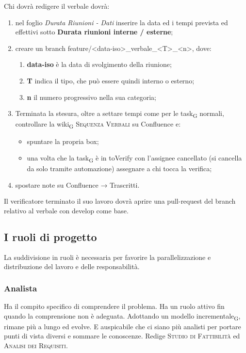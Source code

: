     	Chi dovrà redigere il verbale dovrà:
    	\begin{enumerate}
    		\item nel foglio \textit{Durata Riunioni - Dati} inserire la data ed i tempi prevista ed effettivi  sotto \textbf{Durata riunioni interne / esterne};
    		\item creare un branch feature/<data-iso>\_verbale\_<T>\_<n>, dove:
            \begin{enumerate}
                \item \textbf{data-iso} è la data di svolgimento della riunione;
                \item \textbf{T} indica il tipo, che può essere quindi interno o esterno;
                \item \textbf{n} il numero progressivo nella sua categoria;
            \end{enumerate}
    		\item Terminata la stesura, oltre a settare tempi come per le task\textsubscript{G} normali, controllare la wiki\textsubscript{G} \textsc{Sequenza Verbali} su Confluence e:
    		\begin{itemize}
    			\item spuntare la propria box;
    			\item una volta che la task\textsubscript{G} è in toVerify con l’assignee cancellato (si cancella da solo tramite automazione) assegnare a chi tocca la verifica;
    		\end{itemize}
    		\item spostare note su Confluence → Trascritti.
    	\end{enumerate}
        Il verificatore terminato il suo lavoro dovrà aprire una pull-request del branch relativo al verbale con develop come base.

\subsection{I ruoli di progetto}
    La suddivisione in ruoli è necessaria per favorire la parallelizzazione e distribuzione del lavoro e delle responsabilità.
    \subsubsection{Analista}
    Ha il compito specifico di comprendere il problema. Ha un ruolo attivo fin quando la comprensione non è adeguata. Adottando un modello incrementale\textsubscript{G}, rimane più a lungo ed evolve. E auspicabile che ci siano più analisti per portare punti di vista diversi e sommare le conoscenze. Redige \textsc{Studio di Fattibilità} ed \textsc{Analisi dei Requisiti}.
